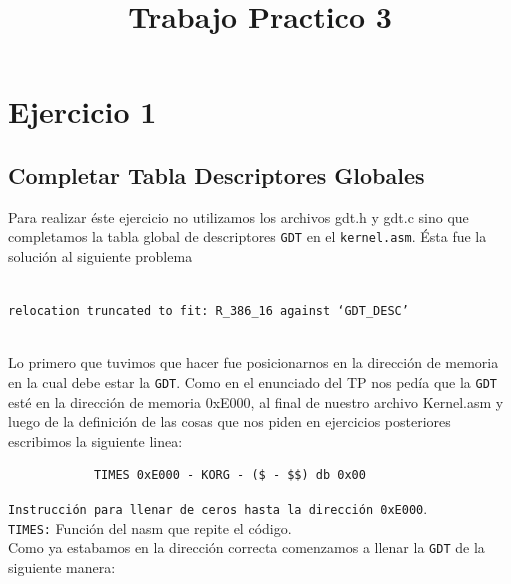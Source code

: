 \documentclass[a4paper, 10pt]{article}
\title{Trabajo Practico 3}
\begin{document}
\maketitle
\newpage

\tableofcontents

\newpage

\section{Ejercicio 1}

\subsection{Completar Tabla Descriptores Globales}

Para realizar \'este ejercicio no utilizamos los archivos gdt.h y gdt.c sino que completamos la tabla global de descriptores \texttt{GDT} en el \texttt{kernel.asm}. 
\'Esta fue la soluci\'on al siguiente problema \\ \\
\centerline{ \texttt{relocation truncated to fit: R\_386\_16 against `GDT\_DESC'}} \\ 

 Lo primero que tuvimos que hacer fue posicionarnos en la direcci\'on de memoria en la cual debe estar la \texttt{GDT}. Como en el enunciado del TP nos ped\'ia que la \texttt{GDT} est\'e en la direcci\'on de memoria 0xE000, al final de nuestro archivo Kernel.asm y luego de la definici\'on de las cosas que nos piden en ejercicios posteriores escribimos la siguiente linea:

\lstset{language=[x86masm]Assembler}
\begin{lstlisting}
			TIMES 0xE000 - KORG - ($ - $$) db 0x00 
\end{lstlisting} 
\texttt{Instrucci\'on para llenar de ceros hasta la direcci\'on 0xE000}. \\
\texttt{TIMES:} Funci\'on del nasm que repite el c\'odigo. \\

Como ya estabamos en la direcci\'on correcta comenzamos a llenar la \texttt{GDT} de la siguiente manera:
 
\end{document}

